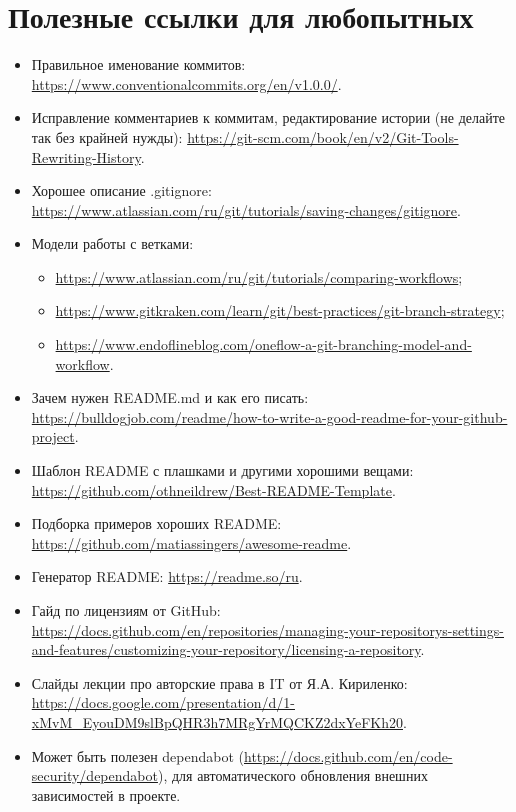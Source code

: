 \documentclass[a5paper]{article}
\begin{document}
\section*{Полезные ссылки для любопытных}

\begin{itemize}
    \item Правильное именование коммитов: \url{https://www.conventionalcommits.org/en/v1.0.0/}.
    \item Исправление комментариев к коммитам, редактирование истории (не делайте так без крайней нужды): \url{https://git-scm.com/book/en/v2/Git-Tools-Rewriting-History}.
    \item Хорошее описание .gitignore: \url{https://www.atlassian.com/ru/git/tutorials/saving-changes/gitignore}.
    \item Модели работы с ветками: 
    \begin{itemize}
        \item \url{https://www.atlassian.com/ru/git/tutorials/comparing-workflows};
        \item \url{https://www.gitkraken.com/learn/git/best-practices/git-branch-strategy};
        \item \url{https://www.endoflineblog.com/oneflow-a-git-branching-model-and-workflow}.
    \end{itemize}
    \item Зачем нужен README.md и как его писать: \url{https://bulldogjob.com/readme/how-to-write-a-good-readme-for-your-github-project}.
    \item Шаблон README с плашками и другими хорошими вещами: \url{https://github.com/othneildrew/Best-README-Template}.
    \item Подборка примеров хороших README: \url{https://github.com/matiassingers/awesome-readme}.
    \item Генератор README: \url{https://readme.so/ru}.
    \item Гайд по лицензиям от GitHub: \url{https://docs.github.com/en/repositories/managing-your-repositorys-settings-and-features/customizing-your-repository/licensing-a-repository}.
    \item Слайды лекции про авторские права в IT от Я.А. Кириленко: \url{https://docs.google.com/presentation/d/1-xMvM_EyouDM9slBpQHR3h7MRgYrMQCKZ2dxYeFKh20}.
    \item Может быть полезен dependabot (\url{https://docs.github.com/en/code-security/dependabot}), для автоматического обновления внешних зависимостей в проекте. 
\end{itemize}
\end{document}
